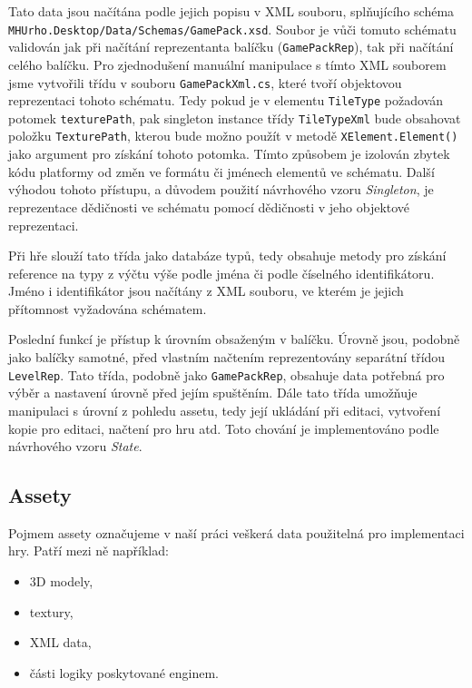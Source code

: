 Tato data jsou načítána podle jejich popisu v XML souboru, splňujícího schéma \texttt{MHUrho.Desktop/Data/Schemas/GamePack.xsd}. Soubor je vůči tomuto schématu validován jak při načítání reprezentanta balíčku (\texttt{GamePackRep}), tak při načítání celého balíčku. Pro zjednodušení manuální manipulace s tímto XML souborem jsme vytvořili třídu v souboru \texttt{GamePackXml.cs}, které tvoří objektovou reprezentaci tohoto schématu. Tedy pokud je v elementu \texttt{TileType} požadován potomek \texttt{texturePath}, pak singleton instance třídy \texttt{TileTypeXml} bude obsahovat položku \texttt{TexturePath}, kterou bude možno použít v metodě \texttt{XElement.Element()} jako argument pro získání tohoto potomka. Tímto způsobem je izolován zbytek kódu platformy od změn ve formátu či jménech elementů ve schématu. Další výhodou tohoto přístupu, a důvodem použití návrhového vzoru \textit{Singleton}, je reprezentace dědičnosti ve schématu pomocí dědičnosti v jeho objektové reprezentaci.

Při hře slouží tato třída jako databáze typů, tedy obsahuje metody pro získání reference na typy z výčtu výše podle jména či podle číselného identifikátoru. Jméno i identifikátor jsou načítány z XML souboru, ve kterém je jejich přítomnost vyžadována schématem.

Poslední funkcí je přístup k úrovním obsaženým v balíčku. Úrovně jsou, podobně jako balíčky samotné, před vlastním načtením reprezentovány separátní třídou \texttt{LevelRep}. Tato třída, podobně jako \texttt{GamePackRep}, obsahuje data potřebná pro výběr a nastavení úrovně před jejím spuštěním. Dále tato třída umožňuje manipulaci s úrovní z pohledu assetu, tedy její ukládání při editaci, vytvoření kopie pro editaci, načtení pro hru atd. Toto chování je implementováno podle návrhového vzoru \textit{State}.

\subsection{Assety}
Pojmem assety označujeme v naší práci veškerá data použitelná pro implementaci hry. Patří mezi ně například:

\begin{itemize}
	\item 3D modely,
	\item textury,
	\item XML data,
	\item části logiky poskytované enginem.
\end{itemize}

